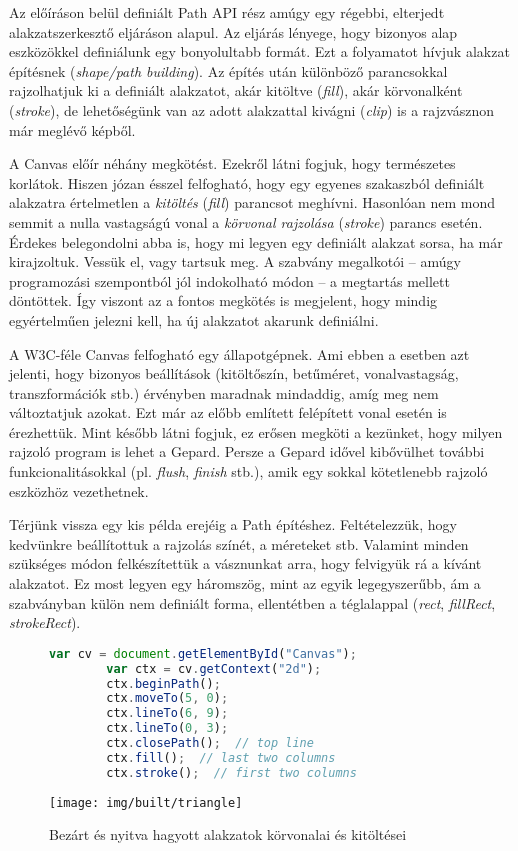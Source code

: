 \documentclass[12pt]{report}
\theoremstyle{definition}
\newcommand{\inenglish}[1]{\textsl{#1}}
\newcommand{\func}[1]{{\textsl{#1}}}
\begin{document}
Az előíráson belül definiált Path API rész amúgy egy régebbi, elterjedt
alakzatszerkesztő eljáráson alapul. Az eljárás lényege, hogy bizonyos alap
eszközökkel definiálunk egy bonyolultabb formát. Ezt a folyamatot hívjuk
alakzat építésnek (\inenglish{shape/path building}). Az építés után különböző
parancsokkal rajzolhatjuk ki a definiált alakzatot, akár kitöltve
(\emph{fill}), akár körvonalként (\emph{stroke}), de lehetőségünk van az adott
alakzattal kivágni (\emph{clip}) is a rajzvásznon már meglévő képből.

A Canvas előír néhány megkötést. Ezekről látni fogjuk, hogy természetes
korlátok. Hiszen józan ésszel felfogható, hogy egy egyenes szakaszból definiált
alakzatra értelmetlen a \emph{kitöltés} (\func{fill}) parancsot meghívni.
Hasonlóan nem mond semmit a nulla vastagságú vonal a \emph{körvonal rajzolása}
(\func{stroke}) parancs esetén. Érdekes belegondolni abba is, hogy mi legyen
egy definiált alakzat sorsa, ha már kirajzoltuk. Vessük el, vagy tartsuk meg. A
szabvány megalkotói -- amúgy programozási szempontból jól indokolható módon --
a megtartás mellett döntöttek. Így viszont az a fontos megkötés is megjelent,
hogy mindig egyértelműen jelezni kell, ha új alakzatot akarunk definiálni.

A W3C-féle Canvas felfogható egy állapotgépnek. Ami ebben a esetben azt
jelenti, hogy bizonyos beállítások (kitöltőszín, betűméret, vonalvastagság,
transzformációk stb.) érvényben maradnak mindaddig, amíg meg nem változtatjuk
azokat. Ezt már az előbb említett felépített vonal esetén is érezhettük. Mint
később látni fogjuk, ez erősen megköti a kezünket, hogy milyen rajzoló program
is lehet a Gepard. Persze a Gepard idővel kibővülhet további
funkcionalitásokkal (pl. \emph{flush}, \emph{finish} stb.), amik egy sokkal
kötetlenebb rajzoló eszközhöz vezethetnek.

Térjünk vissza egy kis példa erejéig a Path építéshez. Feltételezzük, hogy
kedvünkre beállítottuk a rajzolás színét, a méreteket stb. Valamint minden
szükséges módon felkészítettük a vásznunkat arra, hogy felvigyük rá a kívánt
alakzatot. Ez most legyen egy háromszög, mint az egyik legegyszerűbb, ám a
szabványban külön nem definiált forma, ellentétben a téglalappal (\emph{rect},
\emph{fillRect}, \emph{strokeRect}).

  \begin{figure}[!htb]
    \hspace{0.1\textwidth}
      \centering
      \begin{lstlisting}[language=JavaScript, autogobble=true]
        var cv = document.getElementById("Canvas");
        var ctx = cv.getContext("2d");
        ctx.beginPath();
        ctx.moveTo(5, 0);
        ctx.lineTo(6, 9);
        ctx.lineTo(0, 3);
        ctx.closePath();  // top line
        ctx.fill();  // last two columns
        ctx.stroke();  // first two columns
      \end{lstlisting}
    \endminipage
    \hfill
      \texttt{[image: img/built/triangle]}
    \endminipage
    \caption{\label{triangles-code-and-image} Bezárt és nyitva hagyott
    alakzatok körvonalai és kitöltései }
  \end{figure}
\end{document}
